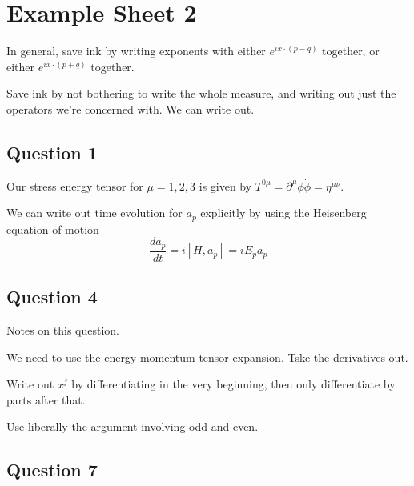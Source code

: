 \section{Example Sheet 2} 

In general, save ink by writing exponents 
with either $ e ^{ i x \cdot  ( p - q ) } $ together, 
or either $ e ^{ i x \cdot  ( p + q ) } $ together.

Save ink by not bothering to write the whole measure, 
and writing out just the operators we're concerned with. 
We can write out. 

\subsection{Question 1} 
Our stress energy tensor for $ \mu  = 1, 2, 3 $
is given by $ T^{  0 \mu }  = \partial  ^ \mu \phi \dot{ \phi }  = \eta^{ \mu \nu  }$. 

We can write out time evolution 
for $ a_{ p } $ explicitly 
by using the Heisenberg equation
of motion 
\[
	\frac{ d a_{ p } }{  dt }  = i [ H , a_ p ] = i E_ p a_ p 
\]

\subsection{Question 4} 
Notes on this question. 

We need to use the energy momentum tensor expansion. 
Tske the derivatives out. 

Write out $ x ^ j  $ by differentiating in the 
very beginning, then only differentiate by parts after that. 

Use liberally the argument involving odd and even. 


\subsection{Question 7} 

